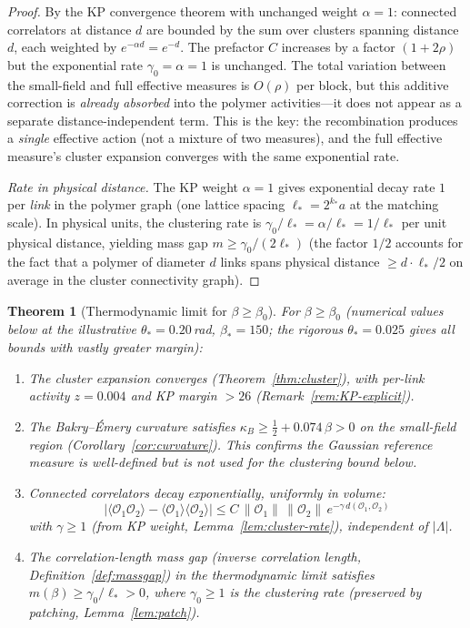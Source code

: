 \documentclass[11pt]{article}
\newtheorem{theorem}{Theorem}[section]
\theoremstyle{definition}
\begin{document}
\begin{proof}
By the KP convergence theorem with unchanged weight
$\alpha=1$: connected correlators at distance $d$ are
bounded by the sum over clusters spanning distance~$d$,
each weighted by $e^{-\alpha d}=e^{-d}$.  The prefactor $C$
increases by a factor $(1+2\rho)$ but the exponential
rate $\gamma_0=\alpha=1$ is unchanged.  The total
variation between the small-field and full effective
measures is $O(\rho)$ per block, but this additive
correction is \emph{already absorbed} into the polymer
activities---it does not appear as a separate distance-independent
term.  This is the key: the recombination produces a
\emph{single} effective action (not a mixture of two measures),
and the full effective measure's cluster expansion converges
with the same exponential rate.

\emph{Rate in physical distance.}
The KP weight $\alpha=1$ gives exponential decay rate $1$
per \emph{link} in the polymer graph (one lattice spacing
$\ell_*=2^{k_*}a$ at the matching scale).  In physical
units, the clustering rate is
$\gamma_0/\ell_*=\alpha/\ell_*=1/\ell_*$
per unit physical distance, yielding mass gap
$m\ge\gamma_0/(2\ell_*)$ (the factor $1/2$ accounts for
the fact that a polymer of diameter $d$ links spans
physical distance $\ge d\cdot\ell_*/2$
on average in the cluster connectivity graph).
\end{proof}

\begin{theorem}[Thermodynamic limit for $\beta\ge\beta_0$]\label{thm:extended}
For $\beta\ge\beta_0$ (numerical values below at the illustrative
$\theta_*=0.20$\,rad, $\beta_*=150$; the rigorous $\theta_*=0.025$
gives all bounds with vastly greater margin):
\begin{enumerate}[nosep,label=(\roman*)]
\item The cluster expansion converges
(Theorem~\ref{thm:cluster}), with per-link activity
$z=0.004$ and KP margin $>26$
(Remark~\ref{rem:KP-explicit}).
\item The Bakry--\'Emery curvature satisfies
$\kappa_B\ge\frac{1}{2}+0.074\,\beta>0$
on the small-field region
(Corollary~\ref{cor:curvature}).  This confirms the
Gaussian reference measure is well-defined but is
\emph{not used} for the clustering bound below.
\item Connected correlators decay exponentially, uniformly in volume:
\begin{equation}
|\langle\mathcal{O}_1\mathcal{O}_2\rangle
-\langle\mathcal{O}_1\rangle\langle\mathcal{O}_2\rangle|
\le C\,\|\mathcal{O}_1\|\,\|\mathcal{O}_2\|\,
e^{-\gamma\,d(\mathcal{O}_1,\mathcal{O}_2)}
\end{equation}
with $\gamma\ge 1$ (from KP weight, Lemma~\ref{lem:cluster-rate}),
independent of $|\Lambda|$.
\item The correlation-length mass gap (inverse correlation length,
Definition~\ref{def:massgap}) in the thermodynamic limit satisfies
$m(\beta)\ge\gamma_0/\ell_*>0$, where $\gamma_0\ge 1$ is the
clustering rate (preserved by patching, Lemma~\ref{lem:patch}).
\end{enumerate}
\end{theorem}
\end{document}
